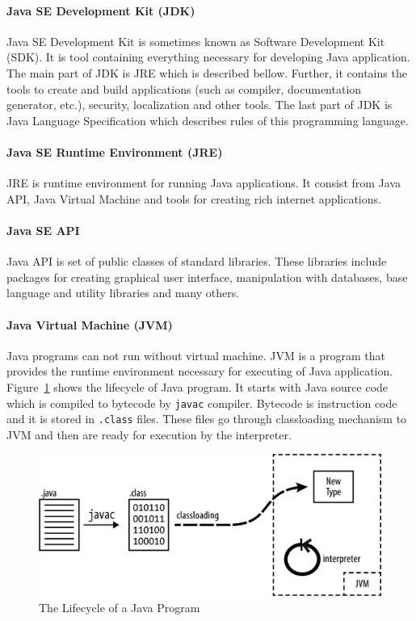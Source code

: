 \paragraph{Java SE Development Kit (JDK)}
Java SE Development Kit is sometimes known as Software Development Kit (SDK). It is tool containing everything necessary for developing Java application. The main part of JDK is JRE which is described bellow. Further, it contains the tools to create and build applications (such as compiler, documentation generator, etc.), security, localization and other tools. The last part of JDK is Java Language Specification which describes rules of this programming language.

\paragraph{Java SE Runtime Environment (JRE)}
JRE is runtime environment for running Java applications. It consist from Java API, Java Virtual Machine and tools for creating rich internet applications.

\paragraph{Java SE API}
Java API is set of public classes of standard libraries. These libraries include packages for creating graphical user interface, manipulation with databases, base language and utility libraries and many others.

\paragraph{Java Virtual Machine (JVM)}
Java programs can not run without virtual machine. JVM is a program that provides the runtime environment necessary for executing of Java application. Figure~\ref{JavaLifecycle} shows the lifecycle of Java program. It starts with Java source code which is compiled to bytecode by \texttt{javac} compiler. Bytecode is instruction code  and it is stored in \texttt{.class} files. These files go through classloading mechanism to JVM and then are ready for execution by the interpreter.
\\
\begin{figure}[h!]
    \centering
    \includegraphics[scale=0.3]{fig/java_program_lifecycle.png}
    \caption{The Lifecycle of a Java Program \cite{JavaBook}}
    \label{JavaLifecycle}
\end{figure}
